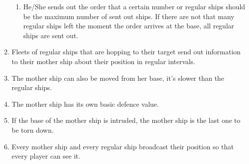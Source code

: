 \begin{enumerate}
\begin{enumerate}[label=\alph*)]
			\item He/She sends out the order that a certain number or regular ships should be the maximum number of sent out ships. If there are not that many regular ships left the moment the order arrives at the base, all regular ships are sent out.
		\end{enumerate}
	\item Fleets of regular ships that are hopping to their target send out information to their mother ship about their position in regular intervals.
	\item The mother ship can also be moved from her base, it's slower than the regular ships.
	\item The mother ship has its own basic defence value.
	\item If the base of the mother ship is intruded, the mother ship is the last one to be torn down.
	\item Every mother ship and every regular ship broadcast their position so that every player can see it.
\end{enumerate}